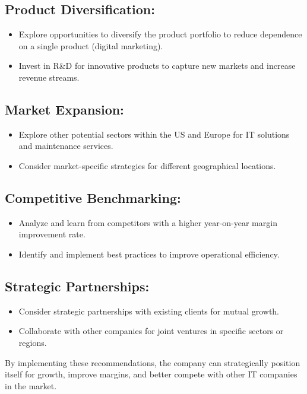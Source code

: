 \documentclass{report}
\begin{document}
\subsection{Product Diversification:}
\begin{itemize}
   \item Explore opportunities to diversify the product portfolio to reduce dependence on a single product (digital marketing).
   \item Invest in R\&D for innovative products to capture new markets and increase revenue streams.
\end{itemize}

\subsection{Market Expansion:}
\begin{itemize}
   \item Explore other potential sectors within the US and Europe for IT solutions and maintenance services.
   \item Consider market-specific strategies for different geographical locations.
\end{itemize}

\subsection{Competitive Benchmarking:}
\begin{itemize}
   \item Analyze and learn from competitors with a higher year-on-year margin improvement rate.
   \item Identify and implement best practices to improve operational efficiency.
\end{itemize}

\subsection{Strategic Partnerships:}
\begin{itemize}
   \item Consider strategic partnerships with existing clients for mutual growth.
   \item Collaborate with other companies for joint ventures in specific sectors or regions.
\end{itemize}

By implementing these recommendations, the company can strategically position itself for growth, improve margins, and better compete with other IT companies in the market.
\end{document}
